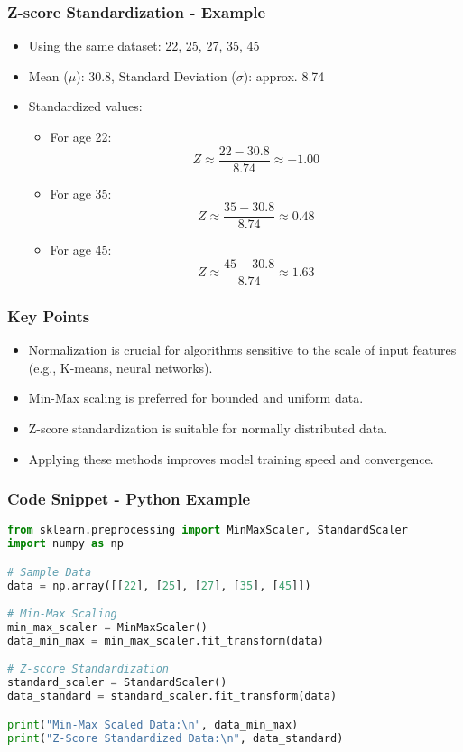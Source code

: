 \documentclass[aspectratio=169]{beamer}
\begin{document}
\begin{frame}
    \frametitle{Z-score Standardization - Example}
    \begin{itemize}
        \item Using the same dataset: {22, 25, 27, 35, 45}
        \item Mean ($\mu$): 30.8, Standard Deviation ($\sigma$): approx. 8.74
        \item Standardized values:
        \begin{itemize}
            \item For age 22:
            \begin{equation}
                Z \approx \frac{22 - 30.8}{8.74} \approx -1.00
            \end{equation}
            \item For age 35:
            \begin{equation}
                Z \approx \frac{35 - 30.8}{8.74} \approx 0.48
            \end{equation}
            \item For age 45:
            \begin{equation}
                Z \approx \frac{45 - 30.8}{8.74} \approx 1.63
            \end{equation}
        \end{itemize}
    \end{itemize}
\end{frame}

\begin{frame}
    \frametitle{Key Points}
    \begin{itemize}
        \item Normalization is crucial for algorithms sensitive to the scale of input features (e.g., K-means, neural networks).
        \item Min-Max scaling is preferred for bounded and uniform data.
        \item Z-score standardization is suitable for normally distributed data.
        \item Applying these methods improves model training speed and convergence.
    \end{itemize}
\end{frame}

\begin{frame}[fragile]
    \frametitle{Code Snippet - Python Example}
    \begin{lstlisting}[language=Python]
from sklearn.preprocessing import MinMaxScaler, StandardScaler
import numpy as np

# Sample Data
data = np.array([[22], [25], [27], [35], [45]])

# Min-Max Scaling
min_max_scaler = MinMaxScaler()
data_min_max = min_max_scaler.fit_transform(data)

# Z-score Standardization
standard_scaler = StandardScaler()
data_standard = standard_scaler.fit_transform(data)

print("Min-Max Scaled Data:\n", data_min_max)
print("Z-Score Standardized Data:\n", data_standard)
    \end{lstlisting}
\end{frame}
\end{document}
